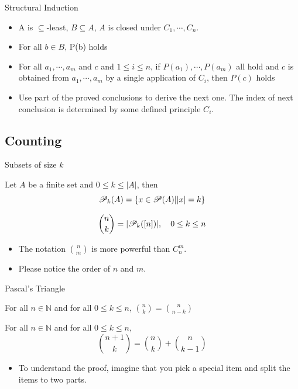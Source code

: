 \begin{frame}{Structural Induction}
    \begin{definition}
        \begin{itemize}
            \item A is $\subseteq$-least, $B\subseteq A$, $A$ is closed under $C_1,\cdots,C_n$.
            \item For all $b\in B$, P(b) holds
            \item For all $a_1,\cdots,a_m$ and $c$ and $1\leq i\leq n$, if $P(a_1),\cdots,P(a_m)$ all hold and $c$ is obtained from $a_1,\cdots,a_m$ by a single application of $C_i$, then $P(c)$ holds
        \end{itemize}
    \end{definition}
    \begin{itemize}
        \item Use part of the proved conclusions to derive the next one. The index of next conclusion is determined by some defined principle $C_i$.
    \end{itemize}
\end{frame}

\subsection{Counting}
\outline
\begin{frame}{Subsets of size $k$}
    \begin{definition}
        Let $A$ be a finite set and $0\leq k\leq |A|$, then $$\mathscr{P}_{k}({A})=\{x\in\mathscr{P}({A})||x|=k\}$$
    \end{definition}
    \begin{definition}
        $$\binom{n}{k}=|\mathscr{P}_{k}({[n]})|,\quad 0\leq k\leq n$$
    \end{definition}
    \begin{itemize}
        \item The notation $\binom{n}{m}$ is more powerful than $C_n^m$.
        \item Please notice the order of $n$ and $m$.
    \end{itemize}
\end{frame}

\begin{frame}{Pascal's Triangle}
    \begin{lemma}
        For all $n\in \mathbb{N}$ and for all $0\leq k\leq n$, $\binom{n}{k}=\binom{n}{n-k}$
    \end{lemma}
    \begin{theorem}
        For all $n\in \mathbb{N}$ and for all $0\leq k\leq n$, $$\binom{n+1}{k}=\binom{n}{k}+\binom{n}{k-1}$$
    \end{theorem}
    \begin{itemize}
        \item To understand the proof, imagine that you pick a special item and split the items to two parts.
    \end{itemize}
\end{frame}

